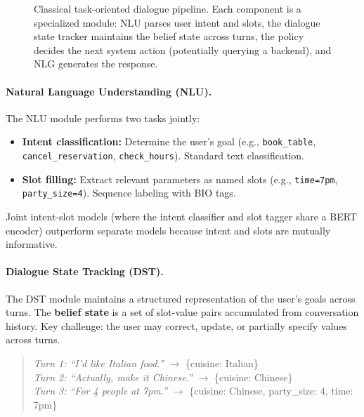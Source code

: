 \begin{figure}[H]
\caption{Classical task-oriented dialogue pipeline.  Each component is a specialized module:
NLU parses user intent and slots, the dialogue state tracker maintains the belief state
across turns, the policy decides the next system action (potentially querying a backend), and
NLG generates the response.}
\label{fig:tod_pipeline}
\end{figure}

\paragraph{Natural Language Understanding (NLU).}
The NLU module performs two tasks jointly:
\begin{itemize}
    \item \textbf{Intent classification:} Determine the user's goal (e.g., \texttt{book\_table},
          \texttt{cancel\_reservation}, \texttt{check\_hours}).  Standard text classification.
    \item \textbf{Slot filling:} Extract relevant parameters as named slots (e.g.,
          \texttt{time=7pm}, \texttt{party\_size=4}).  Sequence labeling with BIO tags.
\end{itemize}
Joint intent-slot models (where the intent classifier and slot tagger share a BERT encoder)
outperform separate models because intent and slots are mutually informative.

\paragraph{Dialogue State Tracking (DST).}
The DST module maintains a structured representation of the user's goals across turns.  The
\textbf{belief state} is a set of slot-value pairs accumulated from conversation history.
Key challenge: the user may correct, update, or partially specify values across turns.

\begin{quote}
\emph{Turn 1: ``I'd like Italian food.''} $\to$ \{cuisine: Italian\} \\
\emph{Turn 2: ``Actually, make it Chinese.''} $\to$ \{cuisine: Chinese\} \\
\emph{Turn 3: ``For 4 people at 7pm.''} $\to$ \{cuisine: Chinese, party\_size: 4, time: 7pm\}
\end{quote}

